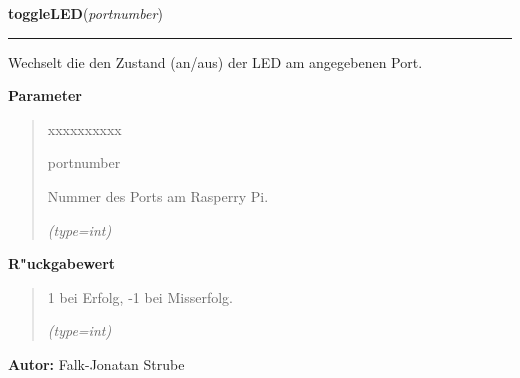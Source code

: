 \hspace{.8\funcindent}\begin{boxedminipage}{\funcwidth}

    \raggedright \textbf{toggleLED}(\textit{portnumber})

    \vspace{-1.5ex}

    \rule{\textwidth}{0.5\fboxrule}
\setlength{\parskip}{2ex}
    Wechselt die den Zustand (an/aus) der LED am angegebenen Port.

\setlength{\parskip}{1ex}
      \textbf{Parameter}
      \vspace{-1ex}

      \begin{quote}
        \begin{Ventry}{xxxxxxxxxx}

          \item[portnumber]

          Nummer des Ports am Rasperry Pi.

            {\it (type=int)}

        \end{Ventry}

      \end{quote}

      \textbf{R"uckgabewert}
    \vspace{-1ex}

      \begin{quote}
      1 bei Erfolg, -1 bei Misserfolg.

      {\it (type=int)}

      \end{quote}

\textbf{Autor:} Falk-Jonatan Strube



    \end{boxedminipage}

    \label{ledleuchtturm:ledFunc:enableLED}

    \vspace{0.5ex}

